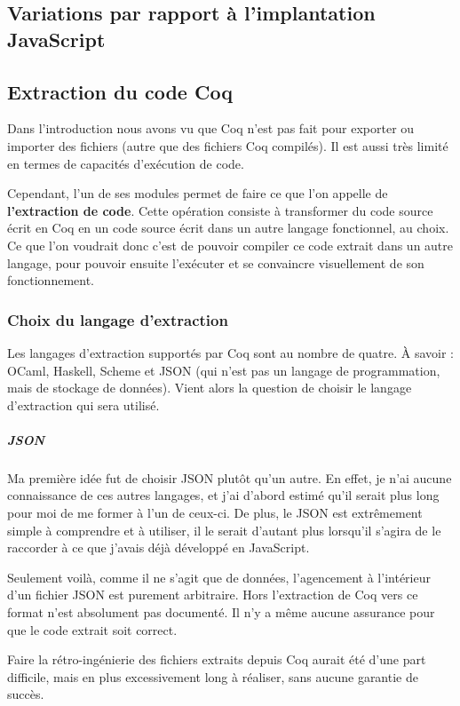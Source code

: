 \documentclass[]{article}
\begin{document}
\subsection{Variations par rapport à l'implantation JavaScript}

\subsection{Extraction du code Coq}
Dans l'introduction nous avons vu que Coq n'est pas fait pour exporter ou importer des fichiers (autre que des fichiers Coq compilés). Il est aussi très limité en termes de capacités d'exécution de code.

Cependant, l'un de ses modules permet de faire ce que l'on appelle de \textbf{l'extraction de code}. Cette opération consiste à transformer du code source écrit en Coq en un code source écrit dans un autre langage fonctionnel, au choix. Ce que l'on voudrait donc c'est de pouvoir compiler ce code extrait dans un autre langage, pour pouvoir ensuite l'exécuter et se convaincre visuellement de son fonctionnement.

\subsubsection{Choix du langage d'extraction}
Les langages d'extraction supportés par Coq sont au nombre de quatre. À savoir : OCaml, Haskell, Scheme et JSON (qui n'est pas un langage de programmation, mais de stockage de données). Vient alors la question de choisir le langage d'extraction qui sera utilisé.

\subparagraph*{JSON}
Ma première idée fut de choisir JSON plutôt qu'un autre. En effet, je n'ai aucune connaissance de ces autres langages, et j'ai d'abord estimé qu'il serait plus long pour moi de me former à l'un de ceux-ci. De plus, le JSON est extrêmement simple à comprendre et à utiliser, il le serait d'autant plus lorsqu'il s'agira de le raccorder à ce que j'avais déjà développé en JavaScript.

Seulement voilà, comme il ne s'agit que de données, l'agencement à l'intérieur d'un fichier JSON est purement arbitraire. Hors l'extraction de Coq vers ce format n'est absolument pas documenté. Il n'y a même aucune assurance pour que le code extrait soit correct.

Faire la rétro-ingénierie des fichiers extraits depuis Coq aurait été d'une part difficile, mais en plus excessivement long à réaliser, sans aucune garantie de succès.
\end{document}
